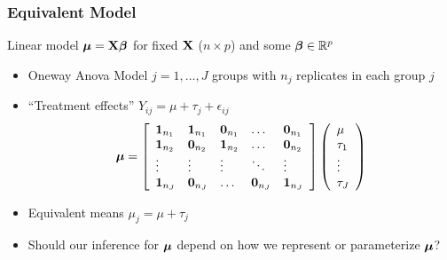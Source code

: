 \documentclass[handout]{beamer}
\begin{document}
\begin{frame}
  \frametitle{Equivalent Model}
Linear model $\boldsymbol{\mu} = \mathbf{X} \boldsymbol{\beta}$ for fixed $\mathbf{X}$ ($n \times p$) and some $\boldsymbol{\beta}
\in \mathbb{R}^p$    \pause

\begin{itemize}
\item  Oneway Anova Model  $j = 1, \ldots, J$ groups with $n_j$
  replicates in each group $j$ \pause
\item 
{``Treatment effects'' $Y_{ij} = \mu + \tau_j + \epsilon_{ij}$}
 $$ \boldsymbol{\mu} = {\left[
  \begin{array}{lllll}
  \mathbf{1}_{n_1} &  \mathbf{1}_{n_1} & \mathbf{0}_{n_1} & \ldots & \mathbf{0}_{n_1} \\
    \mathbf{1}_{n_2} &  \mathbf{0}_{n_2} & \mathbf{1}_{n_2} & \ldots & \mathbf{0}_{n_2} \\
  \vdots &    \vdots & \vdots & \ddots & \vdots \\
  \mathbf{1}_{n_J} & \mathbf{0}_{n_J} & \ldots & \mathbf{0}_{n_J} & \mathbf{1}_{n_J} \\
  \end{array}
   \right] \left(
     \begin{array}{l}
\mu \\ \tau_1 \\ \vdots \\ \tau_J 
    \end{array}
\right)}
$$
 \pause
\item Equivalent means $\mu_j = \mu + \tau_j$
\item  Should our inference for $\boldsymbol{\mu}$ depend on how we represent or
  parameterize $\boldsymbol{\mu}$?
\end{itemize}

\end{frame}
\end{document}

